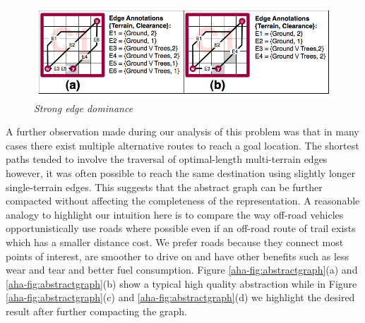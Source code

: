 \begin{figure}[htbp]
	\vspace{-12pt}
        \caption{\emph{Strong edge dominance} }
        \begin{center}
                        \includegraphics[scale=0.3, trim = 20mm 7mm 20mm 5mm]{diagrams/intraedges_initial.png}
        \end{center}
        \label{aha-fig:strongdominance}
	\vspace{-6pt}
\end{figure}
A further observation made during our analysis of this problem was that in many cases there exist multiple alternative routes to reach a goal location.
The shortest paths tended to involve the traversal of optimal-length multi-terrain edges however, it was often possible to reach the same destination using slightly longer single-terrain edges.
This suggests that the abstract graph can be further compacted without affecting the completeness of the representation.
A reasonable analogy to highlight our intuition here is to compare the way off-road vehicles opportunistically use roads where possible even if an off-road route of trail exists which has a smaller distance cost.
We prefer roads because they connect most points of interest, are smoother to drive on and have other benefits such as less wear and tear and better fuel consumption.
Figure \ref{aha-fig:abstractgraph}(a) and \ref{aha-fig:abstractgraph}(b) show a typical high quality abstraction while in Figure \ref{aha-fig:abstractgraph}(c) and \ref{aha-fig:abstractgraph}(d) we highlight the desired result after further compacting the graph.
